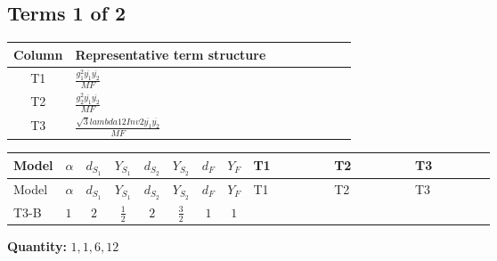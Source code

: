 \documentclass[8pt]{article}
\begin{document}
\begin{landscape}
\subsection*{Terms 1 of 2}
\begin{center}
\begin{tabular}{@{}c >{\raggedright\arraybackslash}p{0.82\linewidth}@{}}
\toprule
Column & Representative term structure \\
\midrule
T1 & \(\displaystyle \frac{g_{1}^{2} \overline{y_{1}} \overline{y_{2}}}{MF}\) \\
\midrule
T2 & \(\displaystyle \frac{g_{2}^{2} \overline{y_{1}} \overline{y_{2}}}{MF}\) \\
\midrule
T3 & \(\displaystyle \frac{\sqrt{3} lambda12Inv2 \overline{y_{1}} \overline{y_{2}}}{MF}\) \\
\midrule
\bottomrule
\end{tabular}
\end{center}
\smallskip
\tiny
\begin{longtable}{@{}llcccccc >{\raggedright\arraybackslash}p{0.21\linewidth} >{\raggedright\arraybackslash}p{0.21\linewidth} >{\raggedright\arraybackslash}p{0.21\linewidth}@{}}
\toprule
Model & $\alpha$ & $d_{S_1}$ & $Y_{S_1}$ & $d_{S_2}$ & $Y_{S_2}$ & $d_F$ & $Y_F$ & T1 & T2 & T3 \\
\midrule
\endfirsthead
\toprule
Model & $\alpha$ & $d_{S_1}$ & $Y_{S_1}$ & $d_{S_2}$ & $Y_{S_2}$ & $d_F$ & $Y_F$ & T1 & T2 & T3 \\
\midrule
\endhead
T3-B & $1$ & $2$ & $\frac{1}{2}$ & $2$ & $\frac{3}{2}$ & $1$ & $1$ & \scriptsize\adjustbox{max width=\linewidth}{$\begin{gathered} - \frac{3 g_{1}^{2} \overline{y_{1}} \overline{y_{2}}}{2 MF}\end{gathered}$} & \scriptsize\adjustbox{max width=\linewidth}{$\begin{gathered} - \frac{3 g_{2}^{2} \overline{y_{1}} \overline{y_{2}}}{4 MF}\end{gathered}$} & \scriptsize\adjustbox{max width=\linewidth}{$\begin{gathered} - \frac{\sqrt{3} lambda12Inv2 \overline{y_{1}} \overline{y_{2}}}{3 MF}\end{gathered}$} \\
\midrule
\bottomrule
\end{longtable}
\clearpage
\noindent\textbf{Quantity: }$\mathrm{1,1,6,12}$\par\smallskip

\end{landscape}
\end{document}
